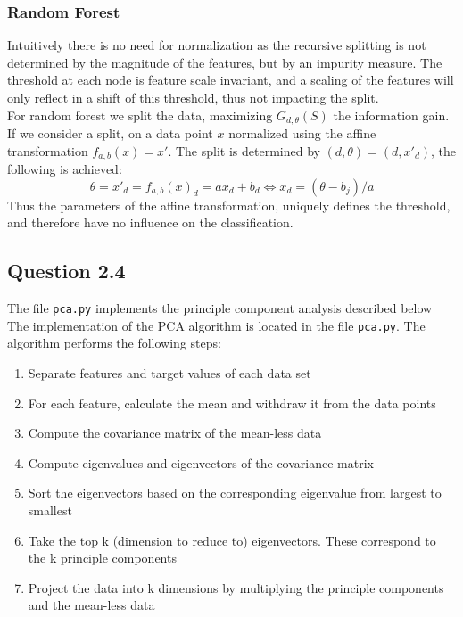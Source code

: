 \documentclass{article}
\begin{document}
\subsubsection{Random Forest}
Intuitively there is no need for normalization as the recursive splitting is not determined by the magnitude of the features, but by an impurity measure. The threshold at each node is feature scale invariant, and a scaling of the features will only reflect in a shift of this threshold, thus not impacting the split. \\
For random forest we split the data, maximizing $G_{d,\theta}(S)$ the information gain. If we consider a split, on a data point $x$ normalized using the affine transformation  $f_{a,b}(x) = x'$. The split is determined by $(d,\theta)=(d,x'_d)$, the following is achieved:
\begin{equation}
\theta = x'_d = f_{a,b}(x)_d = ax_d + b_d \Leftrightarrow
x_d = (\theta -b_j)/a
\end{equation}
Thus the parameters of the affine transformation, uniquely defines the threshold, and therefore have no influence on the classification.
\subsection{Question 2.4}
The file \texttt{pca.py} implements the principle component analysis described below \\
The implementation of the PCA algorithm is located in the file \texttt{pca.py}. The algorithm performs the following steps:
\begin{enumerate}
\item{Separate features and target values of each data set}
\item{For each feature, calculate the mean and withdraw it from the data points}
\item{Compute the covariance matrix of the mean-less data}
\item{Compute eigenvalues and eigenvectors of the covariance matrix}
\item{Sort the eigenvectors based on the corresponding eigenvalue from largest to smallest}
\item{Take the top k (dimension to reduce to) eigenvectors. These correspond to the k principle components}
\item{Project the data into k dimensions by multiplying the principle components and the mean-less data}
\end{enumerate}
\end{document}
